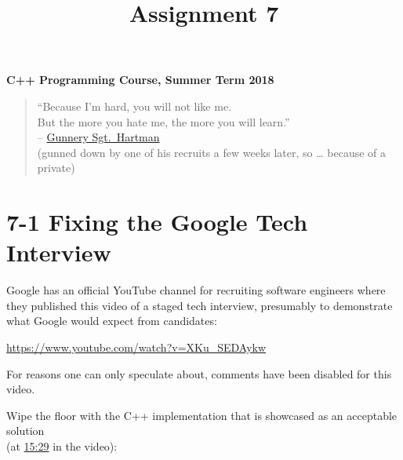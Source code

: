 \documentclass[]{article}
\title{Assignment 7}
\date{}
\begin{document}
\maketitle

\textbf{C++ Programming Course, Summer Term 2018}

\begin{quote}
``Because I'm hard, you will not like me.\\
\hspace*{0.333em}But the more you hate me, the more you will learn.''\\
-- \href{https://www.youtube.com/watch?v=3j3_iPskjxk}{Gunnery
Sgt.~Hartman}\\
\hspace*{0.333em}\hspace*{0.333em}\hspace*{0.333em}(gunned down by one
of his recruits a few weeks later, so \ldots{} because of a private)
\end{quote}

\section{7-1 Fixing the Google Tech
Interview}\label{fixing-the-google-tech-interview}

Google has an official YouTube channel for recruiting software engineers
where they published this video of a staged tech interview, presumably
to demonstrate what Google would expect from candidates:

\url{https://www.youtube.com/watch?v=XKu_SEDAykw}

For reasons one can only speculate about, comments have been disabled
for this video.

Wipe the floor with the C++ implementation that is showcased as an
acceptable solution\\
(at \href{https://youtu.be/XKu_SEDAykw?t=15m29s}{15:29} in the video):
\end{document}
